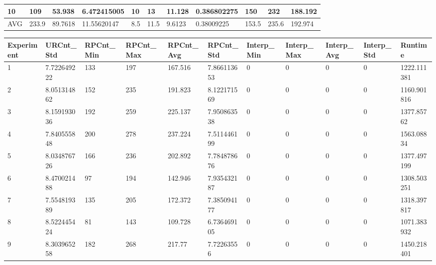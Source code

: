 \begin{table}[H]
\begin{adjustbox}{max width=380pt,keepaspectratio,angle=90}
\begin{tabular}{|l|l|l|l|l|l|l|l|l|l|l|}
					10         & 109       & 53.938    & 6.472415005 & 10           & 13           & 11.128       & 0.386802275  & 150        & 232        & 188.192    \\ \hline
					AVG        & 233.9     & 89.7618   & 11.55620147 & 8.5          & 11.5         & 9.6123       & 0.38009225   & 153.5      & 235.6      & 192.974    \\ \hline
				\end{tabular}
			\end{adjustbox}
			\begin{adjustbox}{max width=380pt,keepaspectratio,angle=90}
				\begin{tabular}{|l|l|l|l|l|l|l|l|l|l|l|}
					\hline
					\rowcolor[HTML]{EFEFEF} 
					Experiment & URCnt\_Std  & RPCnt\_Min & RPCnt\_Max & RPCnt\_Avg & RPCnt\_Std  & Interp\_Min & Interp\_Max & Interp\_Avg & Interp\_Std & Runtime     \\ \hline
					1          & 7.722649222 & 133        & 197        & 167.516    & 7.866113653 & 0           & 0           & 0           & 0           & 1222.111381 \\ \hline
					2          & 8.051314862 & 152        & 235        & 191.823    & 8.122171569 & 0           & 0           & 0           & 0           & 1160.901816 \\ \hline
					3          & 8.159193036 & 192        & 259        & 225.137    & 7.950863538 & 0           & 0           & 0           & 0           & 1377.85762  \\ \hline
					4          & 7.840555848 & 200        & 278        & 237.224    & 7.511446199 & 0           & 0           & 0           & 0           & 1563.08834  \\ \hline
					5          & 8.034876726 & 166        & 236        & 202.892    & 7.784878676 & 0           & 0           & 0           & 0           & 1377.497199 \\ \hline
					6          & 8.470021488 & 97         & 194        & 142.946    & 7.935432187 & 0           & 0           & 0           & 0           & 1308.503251 \\ \hline
					7          & 7.554819389 & 135        & 205        & 172.372    & 7.385094177 & 0           & 0           & 0           & 0           & 1318.397817 \\ \hline
					8          & 8.522445424 & 81         & 143        & 109.728    & 6.736469105 & 0           & 0           & 0           & 0           & 1071.383932 \\ \hline
					9          & 8.303965258 & 182        & 268        & 217.77     & 7.72263556  & 0           & 0           & 0           & 0           & 1450.218401 \\ \hline

\end{tabular}
\end{adjustbox}
\end{table}
